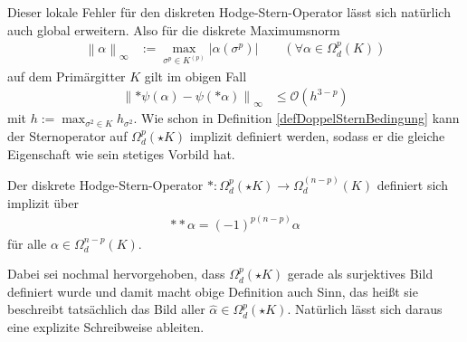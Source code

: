   Dieser lokale Fehler für den diskreten Hodge-Stern-Operator lässt sich natürlich auch global erweitern.
  Also für die diskrete Maximumsnorm
  \begin{align}
    \label{eqDiskreteMaximumsnorm}
    \left\| \alpha \right\|_{\infty} &:= \max_{\sigma^{p}\in K^{(p)}}\left| \alpha(\sigma^{p}) \right| \qquad (\forall\alpha\in\Omega^{p}_{d}(K))
  \end{align}
  auf dem Primärgitter \( K \) gilt im obigen Fall
  \begin{align}
    \left\| *\psi(\alpha) - \psi(*\alpha) \right\|_{\infty} &\le \mathcal{O}\left(h^{3-p}\right)
  \end{align}
  mit \( h:=\max_{\sigma^{2}\in K} h_{\sigma^{2}} \).
  Wie schon in Definition \ref{defDoppelSternBedingung} kann der Sternoperator auf \( \Omega^{p}_{d}(\star K) \) implizit definiert werden,
  sodass er die gleiche Eigenschaft wie sein stetiges Vorbild hat.

  \begin{definition}
    \label{defDualHodgeStern}
    Der diskrete Hodge-Stern-Operator \(*:\Omega^{p}_{d}(\star K) \rightarrow \Omega^{(n-p)}_{d}(K)\) definiert sich implizit über
    \begin{align}
      **\alpha = (-1)^{p(n-p)}\alpha
    \end{align}
    für alle \( \alpha\in\Omega^{n-p}_{d}(K) \).
  \end{definition}

  Dabei sei nochmal hervorgehoben, dass \(\Omega^{p}_{d}(\star K)  \) gerade als surjektives Bild definiert wurde und damit macht obige Definition auch Sinn,
  das heißt sie beschreibt tatsächlich das Bild aller \( \hat\alpha\in\Omega^{p}_{d}(\star K) \).
  Natürlich lässt sich daraus eine explizite Schreibweise ableiten.
  
